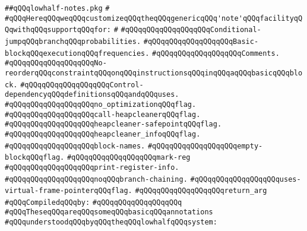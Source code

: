 \label{src/lib/compiler/back/low/code/lowhalf-notes.pkg}
\verb|##qQQqlowhalf-notes.pkg|\newline
\verb|#|\newline
\verb|#qQQqHereqQQqweqQQqcustomizeqQQqtheqQQqgenericqQQq'note'qQQqfacilityqQQqwithqQQqsupportqQQqfor:|\newline
\verb|#|\newline
\verb|#qQQqqQQqqQQqqQQqqQQqConditional-jumpqQQqbranchqQQqprobabilities.|\newline
\verb|#qQQqqQQqqQQqqQQqqQQqBasic-blockqQQqexecutionqQQqfrequencies.|\newline
\verb|#qQQqqQQqqQQqqQQqqQQqComments.|\newline
\verb|#qQQqqQQqqQQqqQQqqQQqNo-reorderqQQqconstraintqQQqonqQQqinstructionsqQQqinqQQqaqQQqbasicqQQqblock.|\newline
\verb|#qQQqqQQqqQQqqQQqqQQqControl-dependencyqQQqdefinitionsqQQqandqQQquses.|\newline
\verb|#qQQqqQQqqQQqqQQqqQQqno_optimizationqQQqflag.|\newline
\verb|#qQQqqQQqqQQqqQQqqQQqcall-heapcleanerqQQqflag.|\newline
\verb|#qQQqqQQqqQQqqQQqqQQqheapcleaner-safepointqQQqflag.|\newline
\verb|#qQQqqQQqqQQqqQQqqQQqheapcleaner_infoqQQqflag.|\newline
\verb|#qQQqqQQqqQQqqQQqqQQqblock-names.|\newline
\verb|#qQQqqQQqqQQqqQQqqQQqempty-blockqQQqflag.|\newline
\verb|#qQQqqQQqqQQqqQQqqQQqmark-reg|\newline
\verb|#qQQqqQQqqQQqqQQqqQQqprint-register-info.|\newline
\verb|#qQQqqQQqqQQqqQQqqQQqnoqQQqbranch-chaining.|\newline
\verb|#qQQqqQQqqQQqqQQqqQQquses-virtual-frame-pointerqQQqflag.|\newline
\verb|#qQQqqQQqqQQqqQQqqQQqreturn_arg|\newline
\newline
\verb|#qQQqCompiledqQQqby:|\newline
\verb|#qQQqqQQqqQQqqQQqqQQq|\newline
\newline
\newline
\verb|#qQQqTheseqQQqareqQQqsomeqQQqbasicqQQqannotations|\newline
\verb|#qQQqunderstoodqQQqbyqQQqtheqQQqlowhalfqQQqsystem:|\newline
